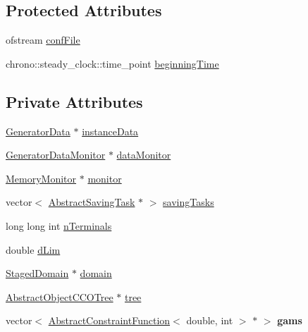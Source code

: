 \subsection*{Protected Attributes}
\begin{DoxyCompactItemize}
\item 
ofstream \hyperlink{class_staged_f_r_r_o_tree_generator_a0f8c6801bbbd5968719911f799d66223}{conf\+File}
\item 
chrono\+::steady\+\_\+clock\+::time\+\_\+point \hyperlink{class_staged_f_r_r_o_tree_generator_abe0c3ffd62ab2f9915a6e09c9c31733b}{beginning\+Time}
\end{DoxyCompactItemize}
\subsection*{Private Attributes}
\begin{DoxyCompactItemize}
\item 
\hyperlink{class_generator_data}{Generator\+Data} $\ast$ \hyperlink{class_staged_f_r_r_o_tree_generator_aa5d549a1ae7bfce749e418301ba92a2f}{instance\+Data}
\item 
\hyperlink{class_generator_data_monitor}{Generator\+Data\+Monitor} $\ast$ \hyperlink{class_staged_f_r_r_o_tree_generator_ad8b06f3c348ba21d7a2eead895fa19c2}{data\+Monitor}
\item 
\hyperlink{class_memory_monitor}{Memory\+Monitor} $\ast$ \hyperlink{class_staged_f_r_r_o_tree_generator_a7f6c92a9f21e8e654dec6a592dbea5d4}{monitor}
\item 
vector$<$ \hyperlink{class_abstract_saving_task}{Abstract\+Saving\+Task} $\ast$ $>$ \hyperlink{class_staged_f_r_r_o_tree_generator_a8e44b058bac0e695c3956dee14ca36c2}{saving\+Tasks}
\item 
long long int \hyperlink{class_staged_f_r_r_o_tree_generator_a4b9c21f516630824f8057aae16f38918}{n\+Terminals}
\item 
double \hyperlink{class_staged_f_r_r_o_tree_generator_a7f36129068076eb3a54f051aa12cda40}{d\+Lim}
\item 
\hyperlink{class_staged_domain}{Staged\+Domain} $\ast$ \hyperlink{class_staged_f_r_r_o_tree_generator_a2f8616a24551a7a414b51b805309894a}{domain}
\item 
\hyperlink{class_abstract_object_c_c_o_tree}{Abstract\+Object\+C\+C\+O\+Tree} $\ast$ \hyperlink{class_staged_f_r_r_o_tree_generator_a3d7a0b0194b93d4c2706a21908ad9f09}{tree}
\item 
vector$<$ \hyperlink{class_abstract_constraint_function}{Abstract\+Constraint\+Function}$<$ double, int $>$ $\ast$ $>$ {\bfseries gams}\hypertarget{class_staged_f_r_r_o_tree_generator_a81551e7195317a26d1a12936590031ce}{}\label{class_staged_f_r_r_o_tree_generator_a81551e7195317a26d1a12936590031ce}


\end{DoxyCompactItemize}
